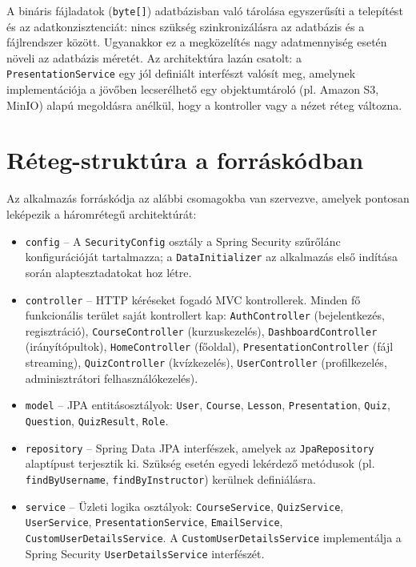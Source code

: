 A bináris fájladatok (\texttt{byte[]}) adatbázisban való tárolása egyszerűsíti a telepítést és az adatkonzisztenciát: nincs szükség szinkronizálásra az adatbázis és a fájlrendszer között. Ugyanakkor ez a megközelítés nagy adatmennyiség esetén növeli az adatbázis méretét. Az architektúra lazán csatolt: a \texttt{PresentationService} egy jól definiált interfészt valósít meg, amelynek implementációja a jövőben lecserélhető egy objektumtároló (pl. Amazon S3, MinIO) alapú megoldásra anélkül, hogy a kontroller vagy a nézet réteg változna.

\section{Réteg-struktúra a forráskódban}

Az alkalmazás forráskódja az alábbi csomagokba van szervezve, amelyek pontosan leképezik a háromrétegű architektúrát:

\begin{itemize}
    \item \texttt{config} – A \texttt{SecurityConfig} osztály a Spring Security szűrőlánc konfigurációját tartalmazza; a \texttt{DataInitializer} az alkalmazás első indítása során alaptesztadatokat hoz létre.
    \item \texttt{controller} – HTTP kéréseket fogadó MVC kontrollerek. Minden fő funkcionális terület saját kontrollert kap: \texttt{AuthController} (bejelentkezés, regisztráció), \texttt{CourseController} (kurzuskezelés), \texttt{DashboardController} (irányítópultok), \texttt{HomeController} (főoldal), \texttt{PresentationController} (fájl streaming), \texttt{QuizController} (kvízkezelés), \texttt{UserController} (profilkezelés, adminisztrátori felhasználókezelés).
    \item \texttt{model} – JPA entitásosztályok: \texttt{User}, \texttt{Course}, \texttt{Lesson}, \texttt{Presentation}, \texttt{Quiz}, \texttt{Question}, \texttt{QuizResult}, \texttt{Role}.
    \item \texttt{repository} – Spring Data JPA interfészek, amelyek az \texttt{JpaRepository} alaptípust terjesztik ki. Szükség esetén egyedi lekérdező metódusok (pl. \texttt{findByUsername}, \texttt{findByInstructor}) kerülnek definiálásra.
    \item \texttt{service} – Üzleti logika osztályok: \texttt{CourseService}, \texttt{QuizService}, \texttt{UserService}, \texttt{PresentationService}, \texttt{EmailService}, \texttt{CustomUserDetailsService}. A \texttt{CustomUserDetailsService} implementálja a Spring Security \texttt{UserDetailsService} interfészét.
\end{itemize}

